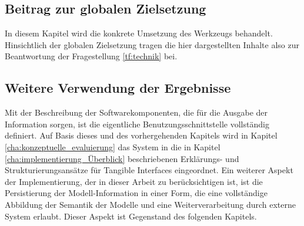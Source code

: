 \subsection{Beitrag zur globalen Zielsetzung}

In diesem Kapitel wird die konkrete Umsetzung des Werkzeugs behandelt. Hinsichtlich der globalen Zielsetzung tragen die hier dargestellten Inhalte also zur Beantwortung der Fragestellung \ref{tf:technik} bei.

\subsection{Weitere Verwendung der Ergebnisse}

Mit der Beschreibung der Softwarekomponenten, die für die Ausgabe der Information sorgen, ist die eigentliche Benutzungsschnittstelle vollständig definiert. Auf Basis dieses und des vorhergehenden Kapitels wird in Kapitel \ref{cha:konzeptuelle_evaluierung} das System in die in Kapitel \ref{cha:implementierung_Überblick} beschriebenen Erklärungs- und Strukturierungsansätze für Tangible Interfaces eingeordnet. Ein weiterer Aspekt der Implementierung, der in dieser Arbeit zu berücksichtigen ist, ist die Persistierung der Modell-Information in einer Form, die eine vollständige Abbildung der Semantik der Modelle und eine Weiterverarbeitung durch externe System erlaubt. Dieser Aspekt ist Gegenstand des folgenden Kapitels.


